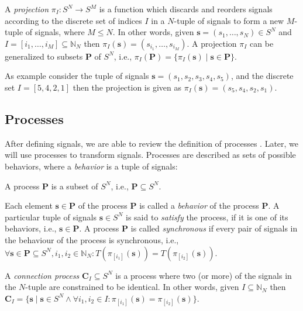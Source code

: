 \begin{definition}\label{tsm-projection}
A \emph{projection} $\pi{}_I: S^N \to S^M$ is a function which discards and reorders signals according
to the discrete set of indices $I$ in a $N$-tuple of signals
to form a new $M$-tuple of signals, where $M \le N$. In other words, given $\mathbf{s} = (s_1,\ldots,s_N) \in S^N$
and $I = [i_1,\ldots,i_M] \subseteq \mathbb{N}_N$
then $\pi{}_I(\mathbf{s}) = (s_{i_1}, \ldots, s_{i_M})$.
A projection $\pi{}_I$ can be generalized to subsets $\mathbf{P}$ of $S^N$,
i.e., $\pi{}_I(\mathbf{P}) = \{\pi{}_I(\mathbf{s}) \mid \mathbf{s} \in \mathbf{P}\}$.
\end{definition}

As example consider the tuple of signals $\mathbf{s} = (s_1,s_2,s_3,s_4,s_5)$, and the discrete set
$I=[5,4,2,1]$ then the projection is given as $\pi{}_I(\mathbf{s}) = (s_5,s_4,s_2,s_1)$.

\subsection{Processes}

After defining signals, we are able to review the definition of processes \cite{ls:1998}.
Later, we will use processes to transform signals.
Processes are described as sets of possible behaviors, where
a \emph{behavior} is a tuple of signals:
\begin{definition}\label{tsm-process}
A process $\mathbf{P}$ is a subset of $S^N$, i.e., $\mathbf{P} \subseteq S^N$.
\end{definition}
Each element $\mathbf{s} \in \mathbf{P}$ of the process $\mathbf{P}$ is
called a \emph{behavior} of the process $\mathbf{P}$. A particular tuple
of signals $\mathbf{s} \in S^N$ is said to \emph{satisfy} the process,
if it is one of its behaviors, i.e., $\mathbf{s} \in \mathbf{P}$.
A process $\mathbf{P}$ is called \emph{synchronous} if
every pair of signals in the behaviour of the process is synchronous, i.e.,
$\forall{\mathbf{s} \in \mathbf{P} \subseteq S^N, i_1, i_2 \in \mathbb{N}_N}:
T(\pi{}_{[i_1]}(\mathbf{s})) = T(\pi{}_{[i_2]}(\mathbf{s}))$.

\begin{definition}\label{tsm-connection}
A \emph{connection process} $\mathbf{C}_I \subseteq S^N$ is a
process where two (or more) of the signals in the $N$-tuple are
constrained to be identical. In other words, given $I \subseteq \mathbb{N}_N$
then $\mathbf{C}_I = \{\mathbf{s} \mid \mathbf{s} \in S^N \wedge \forall{i_1, i_2 \in I}: \pi{}_{[i_1]}(\mathbf{s}) = \pi{}_{[i_2]}(\mathbf{s})\}$.
\end{definition}

